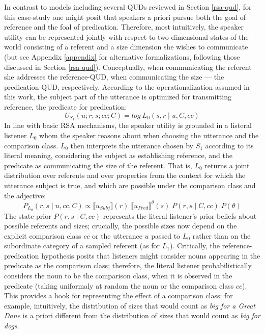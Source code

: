 In contrast to models including several QUDs reviewed in Section \ref{rsa-qud}, for this case-study one might posit that speakers a priori pursue both the goal of reference and the foal of predication. Therefore, most intuitively, the speaker utility can be represented jointly with respect to two-dimensional states of the world consisting of a referent and a size dimension she wishes to communicate (but see Appendix \ref{appendix} for alternative formalizations, following those discussed in Section \ref{rsa-qud}). Conceptually, when communicating the referent she addresses the reference-QUD, when communicating the size --- the predication-QUD, respectively. According to the operationalization assumed in this work, the subject part of the utterance is optimized for transmitting reference, the predicate for predication: 
\begin{equation}
\label{model1}
U_{S_1} (u; r; s; cc; C) = log \: L_0 (s, r \mid u, C, cc) 
\end{equation}
In line with basic RSA mechanisms, the speaker utility is grounded in a listeral listener $L_0$ whom the speaker reasons about when choosing the utterance and the comparison class. 
$L_0$ then interprets the utterance chosen by $S_1$ according to its literal meaning, considering the subject as establishing reference, and the predicate as communicating the size of the referent. 
That is, $L_0$ returns a joint distribution over referents and over properties from the context for which the utterance subject is true, and which are possible under the comparison class and the adjective: %
\begin{equation}
P_{L_0} (r, s \mid u, cc, C) \propto \llbracket u_{Subj} \rrbracket (r)  \;  \llbracket u_{Pred} \rrbracket^{\theta} (s) \; P(r, s \mid C, cc) \; P(\theta)
\end{equation}
The state prior $P(r, s \mid C, cc)$ represents the literal listener's prior beliefs about possible referents and sizes; crucially, the possible sizes now depend on the explicit comparison class $cc$ or the utterance $u$ passed to $L_0$ rather than on the subordinate category of a sampled referent (as for $L_1$). Critically, the reference-predication hypothesis posits that listeners might consider nouns appearing in the predicate as the comparison class; therefore, the literal listener probabilistically considers the noun to be the comparison class, when it is observed in the predicate (taking uniformaly at random the noun or the comparison class $cc$). This provides a hook for representing the effect of a comparison class: for example, intuitively, the distribution of sizes that would count as \emph{big for a Great Dane} is a priori different from the distribution of sizes that would count as \emph{big for dogs}. 
